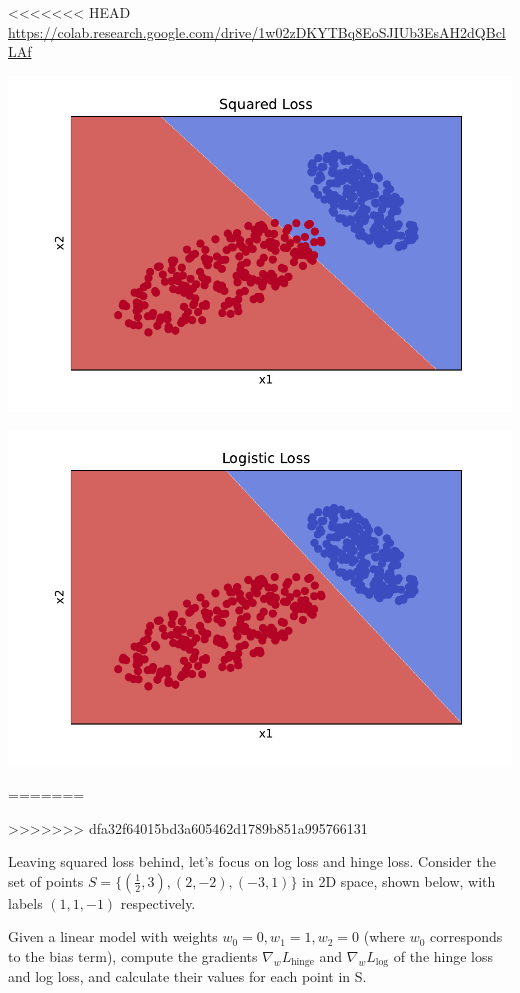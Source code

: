 \begin{solution}
<<<<<<< HEAD
  \url{https://colab.research.google.com/drive/1w02zDKYTBq8EoSJIUb3EsAH2dQBclLAf}
  \begin{center}
    \includegraphics[width=.8\textwidth]{ridge.pdf}
  \end{center}
  \begin{center}
    \includegraphics[width=.8\textwidth]{logistic.pdf}
  \end{center}
=======

>>>>>>> dfa32f64015bd3a605462d1789b851a995766131
\end{solution}

\problem[9]
Leaving squared loss behind, let's focus on log loss and hinge loss. Consider the set of points $S = \{(\frac{1}{2}, 3), (2, -2), (-3, 1)\}$ in 2D space, shown below, with labels $(1, 1, -1)$ respectively.

Given a linear model with weights $w_0 = 0, w_1 = 1, w_2 = 0$ (where $w_0$ corresponds to the bias term), compute the gradients $\nabla_{w}L_{\text{hinge}}$ and $\nabla_{w}L_{\text{log}}$ of the hinge loss and log loss, and calculate their values for each point in S.


